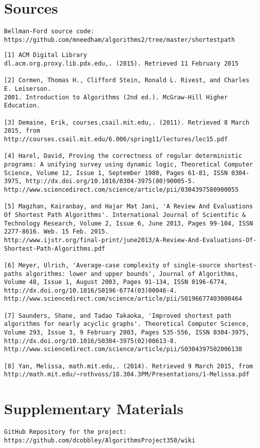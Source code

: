 \documentclass{article}
\begin{document}
\section{Sources}

\begin{verbatim}
Bellman-Ford source code:
https://github.com/mneedham/algorithms2/tree/master/shortestpath
\end{verbatim}

\begin{lstlisting}
[1] ACM Digital Library
dl.acm.org.proxy.lib.pdx.edu,. (2015). Retrieved 11 February 2015

[2] Cormen, Thomas H., Clifford Stein, Ronald L. Rivest, and Charles E. Leiserson.
2001. Introduction to Algorithms (2nd ed.). McGraw-Hill Higher Education. 

[3] Demaine, Erik, courses.csail.mit.edu,. (2011). Retrieved 8 March 2015, from http://courses.csail.mit.edu/6.006/spring11/lectures/lec15.pdf

[4] Harel, David, Proving the correctness of regular deterministic programs: A unifying survey using dynamic logic, Theoretical Computer Science, Volume 12, Issue 1, September 1980, Pages 61-81, ISSN 0304-3975, http://dx.doi.org/10.1016/0304-3975(80)90005-5.
http://www.sciencedirect.com/science/article/pii/0304397580900055

[5] Magzhan, Kairanbay, and Hajar Mat Jani, 'A Review And Evaluations Of Shortest Path Algorithms'. International Journal of Scientific & Technology Research, Volume 2, Issue 6, June 2013, Pages 99-104, ISSN 2277-8616. Web. 15 Feb. 2015.
http://www.ijstr.org/final-print/june2013/A-Review-And-Evaluations-Of-Shortest-Path-Algorithms.pdf

[6] Meyer, Ulrich, 'Average-case complexity of single-source shortest-paths algorithms: lower and upper bounds', Journal of Algorithms, Volume 48, Issue 1, August 2003, Pages 91-134, ISSN 0196-6774, http://dx.doi.org/10.1016/S0196-6774(03)00046-4.
http://www.sciencedirect.com/science/article/pii/S0196677403000464

[7] Saunders, Shane, and Tadao Takaoka, 'Improved shortest path algorithms for nearly acyclic graphs'. Theoretical Computer Science, Volume 293, Issue 3, 9 February 2003, Pages 535-556, ISSN 0304-3975, http://dx.doi.org/10.1016/S0304-3975(02)00613-8.
http://www.sciencedirect.com/science/article/pii/S0304397502006138

[8] Yan, Melissa, math.mit.edu,. (2014). Retrieved 9 March 2015, from http://math.mit.edu/~rothvoss/18.304.3PM/Presentations/1-Melissa.pdf

\end{lstlisting}

\section{Supplementary Materials}
\begin{verbatim}
GitHub Repository for the project:
https://github.com/dcobbley/AlgorithmsProject350/wiki
\end{verbatim}
\end{document}
